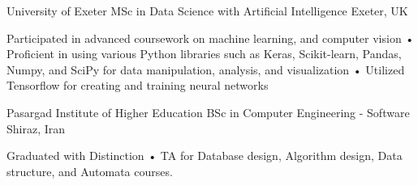 

\begin{cventries}

  \cventry
    {University of Exeter} %
    {MSc in Data Science with Artificial Intelligence} %
    {Exeter, UK} %
    {} %
    {
      \begin{cvitems} %
        \item {Participated in advanced coursework on machine learning, and computer vision • Proficient in using various Python libraries such as Keras, Scikit-learn, Pandas, Numpy, and SciPy for data manipulation, analysis, and visualization • Utilized Tensorflow for creating and training neural networks}
      \end{cvitems}
    }
    
  \cventry
    {Pasargad Institute of Higher Education} %
    {BSc in Computer Engineering - Software} %
    {Shiraz, Iran} %
    {} %
    {
      \begin{cvitems} %
        \item {Graduated with Distinction • TA for Database design, Algorithm design, Data structure, and Automata courses.}
      \end{cvitems}
    }
\end{cventries}
